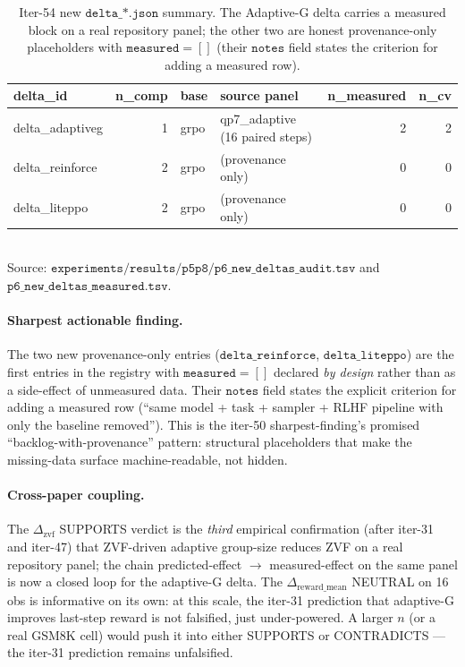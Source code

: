 \begin{table}[t]
\centering\small
\caption{Iter-54 new $\texttt{delta\_*.json}$ summary. The Adaptive-G
delta carries a measured block on a real repository panel; the other two
are honest provenance-only placeholders with $\texttt{measured}=[]$
(their $\texttt{notes}$ field states the criterion for adding a
measured row).}
\label{tab:p6-new-deltas}
\begin{tabular}{l r l l r r}
\toprule
delta\_id & n\_comp & base & source panel & n\_measured & n\_cv \\
\midrule
delta\_adaptiveg & 1 & grpo & qp7\_adaptive (16 paired steps) & 2 & 2 \\
delta\_reinforce  & 2 & grpo & (provenance only)         & 0 & 0 \\
delta\_liteppo    & 2 & grpo & (provenance only)         & 0 & 0 \\
\bottomrule
\end{tabular}\\
\footnotesize{Source: $\texttt{experiments/results/p5p8/p6\_new\_deltas\_audit.tsv}$
and $\texttt{p6\_new\_deltas\_measured.tsv}$.}
\end{table}

\paragraph{Sharpest actionable finding.}
The two new provenance-only entries ($\texttt{delta\_reinforce}$,
$\texttt{delta\_liteppo}$) are the first entries in the registry with
$\texttt{measured}=[]$ declared \emph{by design} rather than as a
side-effect of unmeasured data. Their $\texttt{notes}$ field states
the explicit criterion for adding a measured row
(``same model + task + sampler + RLHF pipeline with only the baseline
removed''). This is the iter-50 sharpest-finding's promised
``backlog-with-provenance'' pattern: structural placeholders that
make the missing-data surface machine-readable, not hidden.

\paragraph{Cross-paper coupling.}
The $\Delta_{\text{zvf}}$ SUPPORTS verdict is the \emph{third}
empirical confirmation (after iter-31 and iter-47) that
ZVF-driven adaptive group-size reduces ZVF on a real repository panel;
the chain predicted-effect $\to$ measured-effect on the same panel
is now a closed loop for the adaptive-G delta. The
$\Delta_{\text{reward\_mean}}$ NEUTRAL on 16 obs is informative on
its own: at this scale, the iter-31 prediction that adaptive-G
improves last-step reward is not falsified, just under-powered. A
larger $n$ (or a real GSM8K cell) would push it into either
SUPPORTS or CONTRADICTS --- the iter-31 prediction remains
unfalsified.

